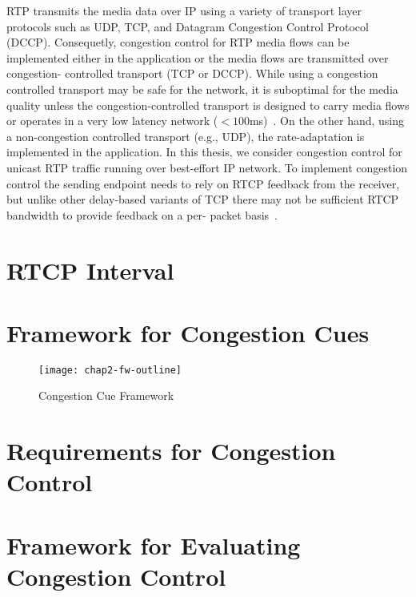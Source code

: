 
RTP transmits the media data over IP using a variety of transport layer
protocols such as UDP, TCP, and Datagram Congestion Control Protocol (DCCP).
Consequetly, congestion control for RTP media flows can be implemented either
in the application or the media flows are transmitted over congestion-%
controlled transport (TCP or DCCP). While using a congestion controlled
transport may be safe for the network, it is suboptimal for the media quality
unless the congestion-controlled transport is designed to carry media flows or
operates in a very low latency network ($<100$ms)~\cite{Brosh:tcp-real-time}.
On the other hand, using a non-congestion controlled transport (e.g., UDP),
the rate-adaptation is implemented in the application. In this thesis, we
consider congestion control for unicast RTP traffic running over best-effort
IP network. To implement congestion control the sending endpoint needs to rely
on RTCP feedback from the receiver, but unlike other delay-based variants of
TCP there may not be sufficient RTCP bandwidth to provide feedback on a per-
packet basis~\cite{draft.rmcat.feedback}.


\section{RTCP Interval}

\section{Framework for Congestion Cues}
\label{fw.fw}


\begin{figure}
\texttt{[image: chap2-fw-outline]}
\caption{Congestion Cue Framework}
\label{fig:4:fw}
\end{figure}


\section{Requirements for Congestion Control}
\label{fw.cc.req}

\section{Framework for Evaluating Congestion Control}
\label{fw.cc.eval}

